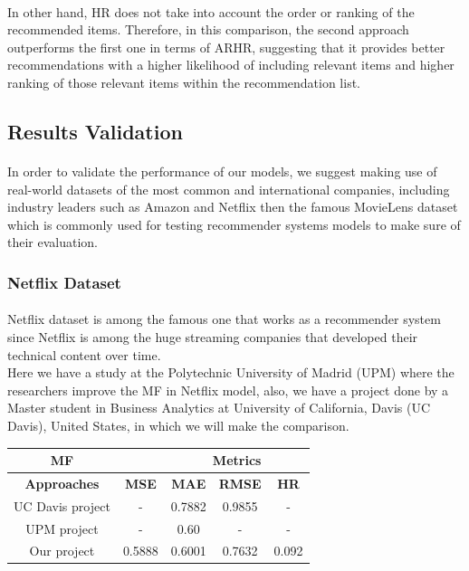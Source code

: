 \documentclass{cup-pan}
\begin{document}
\paragraph{}
In other hand, HR does not take into account the order or ranking of the recommended items. Therefore, in this comparison, the second approach outperforms the first one in terms of ARHR, suggesting that it provides better recommendations with a higher likelihood of including relevant items and higher ranking of those relevant items within the recommendation list.
\subsection{Results Validation}
\paragraph{}
In order to validate the performance of our models, we suggest making use of real-world datasets of the most common and international companies, including industry leaders such as Amazon and Netflix then the famous MovieLens dataset which is commonly used for testing recommender systems models to make sure of their evaluation.

\subsubsection{Netflix Dataset}
\paragraph{}
Netflix dataset is among the famous one that works as a recommender
system since Netflix is among the huge streaming companies that developed their
technical content over time.
\\ 
Here we have a study at the Polytechnic University of Madrid (UPM) \cite{15} where the researchers improve the MF in Netflix model, also, we have a project \cite{16} done by a Master student in Business Analytics at University of California, Davis (UC Davis), United States, in which we will make the comparison.

\begin{center} 
  \begin{tabular}{||c||c|c|c| c||}
    \hline\hline 
    \textbf{MF} & \multicolumn{1}{c}{\textbf{}} & \multicolumn{3}{c||}{\hspace{-1.5cm}\textbf{Metrics}} \\
    \hline\hline 
  
    
    \multicolumn{1}{||c||}{\textbf{Approaches}} & \textbf{MSE} & \textbf{MAE} & \textbf{RMSE} & \textbf{HR}\\
    \hline 
    UC Davis project & - & 0.7882 & 0.9855 & -\\
    UPM project & - & 0.60 & - & - \\
    Our project & 0.5888 & 0.6001 & 0.7632 & 0.092\\
    \hline\hline
  \end{tabular}
\end{center}
\end{document}
